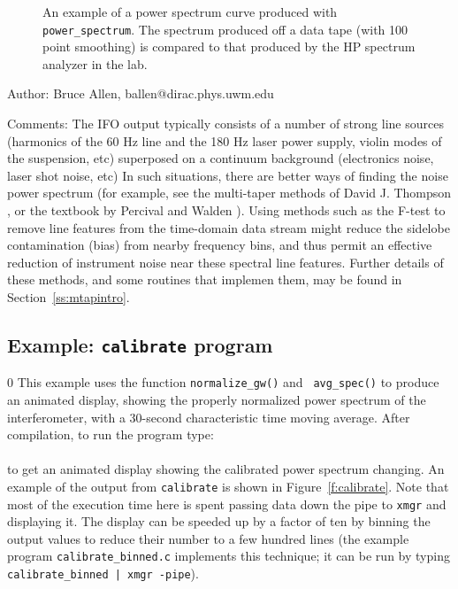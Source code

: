 \begin{figure}[hb]
\begin{center}
\caption{\label{f:pspec} An example of a power spectrum curve produced
with {\tt power\_spectrum}.  The spectrum produced off a data tape
(with 100 point smoothing) is compared to that produced by the HP
spectrum analyzer in the lab.}
\end{center}
\end{figure}

\begin{description}
\item{Author:}
Bruce Allen, ballen@dirac.phys.uwm.edu
\item{Comments:}
The IFO output typically consists of a number of strong line sources
(harmonics of the 60 Hz line and the 180 Hz laser power supply, violin
modes of the suspension, etc) superposed on a continuum background
(electronics noise, laser shot noise, etc)  In such situations, there
are better ways of finding the noise power spectrum (for example, see the
multi-taper methods of David J. Thompson \cite{thomson82}, or the textbook
by Percival and Walden \cite{percivalwalden}). Using methods such as the
F-test to remove line features from the time-domain data stream might
reduce the sidelobe contamination (bias) from nearby frequency bins,
and thus permit an effective reduction of instrument noise near these
spectral line features.  Further details of these methods, and some
routines that implemen them, may be found in Section~\ref{ss:mtapintro}.
\end{description}
\clearpage

\subsection{Example: {\tt calibrate} program}
\setcounter{equation}0
This example uses the function {\tt normalize\_gw()} and {\tt
avg\_spec()} to produce an animated display, showing the properly
normalized power spectrum of the interferometer, with a 30-second
characteristic time moving average.  After compilation, to run the
program type:\\
 \\
to get an animated display showing the calibrated power spectrum
changing.  An example of the output from {\tt calibrate} is shown in
Figure~\ref{f:calibrate}.  Note that most of the execution time here is
spent passing data down the pipe to {\tt xmgr} and displaying it.  The
display can be speeded up by a factor of ten by binning the
output values to reduce their number to a few hundred lines (the example
program {\tt calibrate\_binned.c} implements this technique; it can be
run by typing {\tt calibrate\_binned | xmgr -pipe}).

